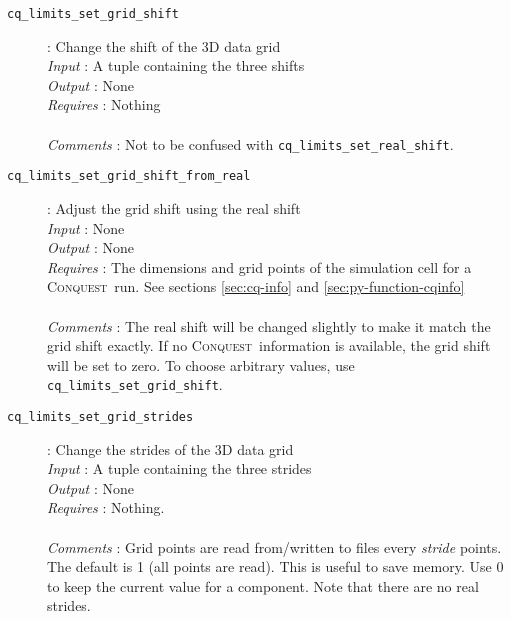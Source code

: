 \documentclass[a4paper,notitlepage,11pt]{article}
\def\CQ{\textsc{Conquest}}
\begin{document}
\begin{description}
\item[\texttt{cq\_limits\_set\_grid\_shift}]: Change the shift of the 3D data grid\\
  \emph{Input} : A tuple containing the three shifts\\
  \emph{Output} : None\\
  \emph{Requires} : Nothing\\
  \\
  \emph{Comments} : Not to be confused with \texttt{cq\_limits\_set\_real\_shift}.
\end{description}

\begin{description}
\item[\texttt{cq\_limits\_set\_grid\_shift\_from\_real}]: Adjust
the grid shift using the real shift\\ \emph{Input} : None\\ \emph{Output} :
None\\ \emph{Requires} : The dimensions and grid points of the simulation cell for a \CQ\ run. 
  See sections \ref{sec:cq-info} and \ref{sec:py-function-cqinfo}\\
  \\
  \emph{Comments} : The real shift will be changed slightly to make it match
  the grid shift exactly. If no \CQ\ information is available, the grid shift
  will be set to zero. To choose arbitrary values, use \texttt{cq\_limits\_set\_grid\_shift}.
\end{description}

\begin{description}
\item[\texttt{cq\_limits\_set\_grid\_strides}]: Change the strides of the 3D data grid\\
  \emph{Input} : A tuple containing the three strides\\
  \emph{Output} : None\\
  \emph{Requires} : Nothing.\\
  \\
  \emph{Comments} : Grid points are read from/written to files every \emph{stride} points. The default is 1 (all points are read).
  This is useful to save memory.
  Use 0 to keep the current value for a component.
  Note that there are no real strides.
\end{description}
\end{document}
